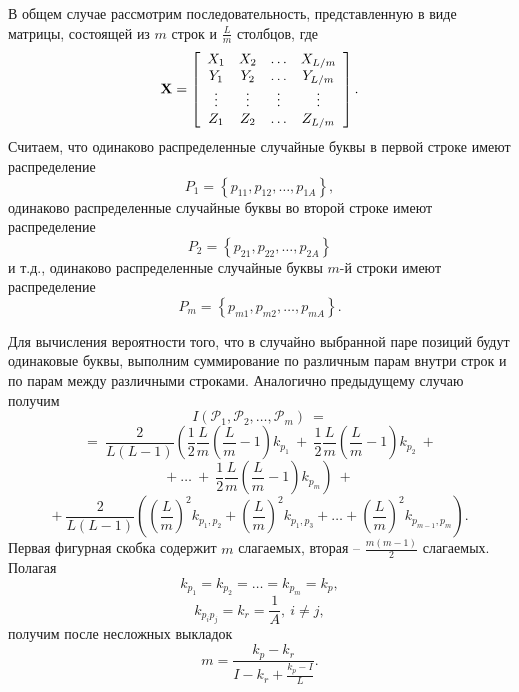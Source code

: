 В общем случае рассмотрим последовательность, представленную в виде матрицы, состоящей из $m$  строк и $\frac{L}{m}$ столбцов, где
\[
{\mathbf X} = \left[ {\begin{array}{*{20}c}
   {X_1 } & {X_2 } &  \ldots  & {X_{L/m} }  \\
   {Y_1 } & {Y_2 } &  \ldots  & {Y_{L/m} }  \\
    \vdots  &  \vdots  &  \vdots  &  \vdots   \\
   {Z_1 } & {Z_2 } &  \ldots  & {Z_{L/m} }  \\
\end{array}} \right].
\]
Считаем, что одинаково распределенные случайные буквы в первой строке имеют распределение
    \[ P_1  = \left\{ {p_{11} ,p_{12} ,  \ldots , p_{1A} } \right\}, \]
одинаково распределенные случайные буквы во второй строке имеют распределение
    \[ P_2  = \left\{ {p_{21} ,p_{22} ,  \ldots , p_{2A} } \right\} \]
и т.д., одинаково распределенные случайные буквы $m$-й строки имеют распределение
    \[ P_m  = \left\{ {p_{m1},p_{m2} ,  \ldots , p_{mA} } \right\}. \]

Для вычисления вероятности того, что в случайно выбранной паре позиций  будут одинаковые буквы, выполним суммирование по различным парам внутри строк и по парам между различными строками. Аналогично предыдущему случаю получим
{ \small
\[
    I(\mathcal{P}_1, \mathcal{P}_2, \ldots, \mathcal{P}_m ) ~=
\] \[
    =~ \frac{2}{L(L - 1)} \left( \frac{1}{2} \frac{L}{m} \left( \frac{L}{m} - 1 \right) k_{p_1} ~+~
        \frac{1}{2} \frac{L}{m} \left( \frac{L}{m} - 1 \right) k_{p_2} ~+ \right.
\] \[
        +~ \dots ~+~ \left. \frac{1}{2} \frac{L}{m} \left( \frac{L}{m} - 1 \right) k_{p_m} \right) ~+
\] \[
       +~ \frac{2}{L(L - 1)} \left( \left( \frac{L}{m} \right)^2 k_{p_1, p_2} +
         \left( \frac{L}{m} \right)^2 k_{p_1, p_3} + \dots +
        \left( \frac{L}{m} \right)^2 k_{p_{m - 1}, p_m } \right).
\] }
Первая фигурная скобка содержит  $m$ слагаемых, вторая -- $ \frac{m(m-1)}{2}$ слагаемых. Полагая
    \[ k_{p_1} = k_{p_2} = \dots = k_{p_m} = k_p, \]
    \[ k_{p_i p_j } = k_r = \frac{1}{A}, ~ i \ne j, \]
получим после несложных выкладок
    \[ m = \frac{k_p  - k_r}{I - k_r  + \frac{k_p  - I}{L}}. \]
